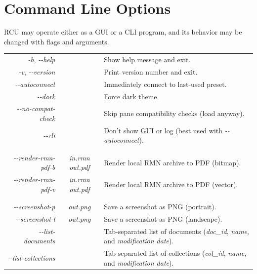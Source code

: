 \documentclass{memoir}
\begin{document}
{\newpage
\chapter{Command Line Options}
\label{sec:cli}
RCU may operate either as a GUI or a CLI program, and its behavior may be changed with flags and arguments.

\vspace{0.5cm}
\begin{tabular}{ r | c | l }
\textit{\--h}, \textit{\--\--help} & & Show help message and exit. \\
\textit{\--v}, \textit{\--\--version} & & Print version number and exit. \\
\textit{\--\--autoconnect} & & Immediately connect to last-used preset. \\
\textit{\--\--dark} & & Force dark theme. \\
\textit{\--\--no-compat-check} & & Skip pane compatibility checks (load anyway). \\
\textit{\--\--cli} & & Don't show GUI or log (best used with \textit{\--\--autoconnect}). \\
&&\\&&\\
\textit{\--\--render-rmn-pdf-b} & \textit{in.rmn \hspace{0.2cm} out.pdf} & Render local RMN archive to PDF (bitmap). \\
\textit{\--\--render-rmn-pdf-v} & \textit{in.rmn \hspace{0.2cm} out.pdf} & Render local RMN archive to PDF (vector). \\
&&\\&&\\
\textit{\--\--screenshot-p}  & \textit{out.png} & Save a screenshot as PNG (portrait). \\
\textit{\--\--screenshot-l} & \textit{out.png} & Save a screenshot as PNG (landscape). \\

\textit{\--\--list-documents} & & Tab-separated list of documents (\textit{doc\_id}, \textit{name}, and \textit{modification date}). \\
\textit{\--\--list-collections} & & Tab-separated list of collections (\textit{col\_id}, \textit{name}, and \textit{modification date}). \\


\end{tabular}}
\end{document}
